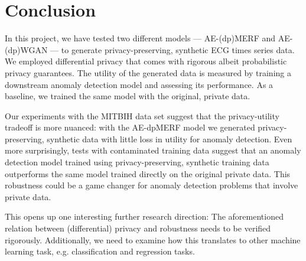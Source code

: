 \section{Conclusion}

In this project, we have tested two different models --- AE-(dp)MERF and AE-(dp)WGAN --- to generate privacy-preserving, synthetic ECG times series data. We employed differential privacy that comes with rigorous albeit probabilistic privacy guarantees. The utility of the generated data is measured by training a downstream anomaly detection model and assessing its performance. As a baseline, we trained the same model with the original, private data.

Our experiments with the MITBIH data set suggest that the privacy-utility tradeoff is more nuanced: with the AE-dpMERF model we generated privacy-preserving, synthetic data with little loss in utility for anomaly detection. Even more surprisingly, tests with contaminated training data suggest that an anomaly detection model trained using privacy-preserving, synthetic training data outperforms the same model trained directly on the original private data. This robustness could be a game changer for anomaly detection problems that involve private data.

This opens up one interesting further research direction: The aforementioned relation between (differential) privacy and robustness needs to be verified rigorously. Additionally, we need to examine how this translates to other machine learning task, e.g. classification and regression tasks. 
